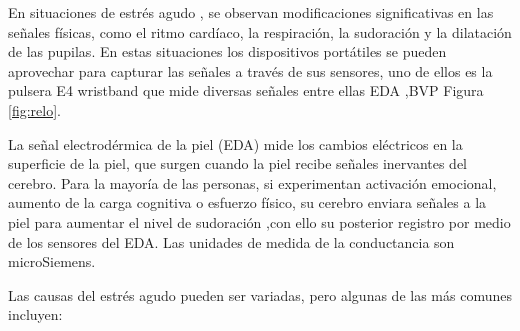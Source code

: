 En situaciones de estrés agudo , se observan modificaciones significativas en las señales físicas, como el ritmo cardíaco, la respiración, la sudoración y la dilatación de las pupilas.
En estas situaciones  los dispositivos portátiles se pueden aprovechar para capturar las señales a través  de     sus  sensores, uno de ellos es la pulsera E4 wristband que mide  diversas señales entre ellas EDA ,BVP Figura \ref{fig:relo}.










La señal electrodérmica de la piel (EDA) mide  los cambios eléctricos en la superficie de la piel, que surgen cuando la piel recibe señales inervantes del cerebro. Para la mayoría de las personas, si experimentan activación emocional, aumento de la carga cognitiva o esfuerzo físico, su cerebro enviara señales a la piel para aumentar el nivel de sudoración ,con ello su posterior registro por medio de los sensores del EDA.
Las unidades de medida de la conductancia son microSiemens.



Las causas del estrés agudo pueden ser variadas, pero algunas de las más comunes incluyen:

